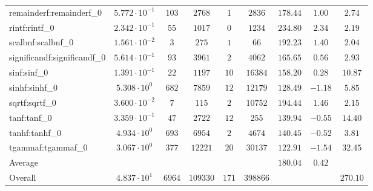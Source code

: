 \begin{tabular}{|l|c|c|c|c|c|c|c|c|}
remainderf:remainderf\_0     & $ 5.772 \cdot 10^{-1} $ & $ 103    $ & $ 2768   $ & $ 1   $ & $ 2836   $ & $ 178.44      $ & $ 1.00    $ & $ 2.74    $ \\
rintf:rintf\_0               & $ 2.342 \cdot 10^{-1} $ & $ 55     $ & $ 1017   $ & $ 0   $ & $ 1234   $ & $ 234.80      $ & $ 2.34    $ & $ 2.19    $ \\
scalbnf:scalbnf\_0           & $ 1.561 \cdot 10^{-2} $ & $ 3      $ & $ 275    $ & $ 1   $ & $ 66     $ & $ 192.23      $ & $ 1.40    $ & $ 2.04    $ \\
significandf:significandf\_0 & $ 5.614 \cdot 10^{-1} $ & $ 93     $ & $ 3961   $ & $ 2   $ & $ 4062   $ & $ 165.65      $ & $ 0.56    $ & $ 2.93    $ \\
sinf:sinf\_0                 & $ 1.391 \cdot 10^{-1} $ & $ 22     $ & $ 1197   $ & $ 10  $ & $ 16384  $ & $ 158.20      $ & $ 0.28    $ & $ 10.87   $ \\
sinhf:sinhf\_0               & $ 5.308 \cdot 10^{0}  $ & $ 682    $ & $ 7859   $ & $ 12  $ & $ 12179  $ & $ 128.49      $ & $ -1.18   $ & $ 5.85    $ \\
sqrtf:sqrtf\_0               & $ 3.600 \cdot 10^{-2} $ & $ 7      $ & $ 115    $ & $ 2   $ & $ 10752  $ & $ 194.44      $ & $ 1.46    $ & $ 2.15    $ \\
tanf:tanf\_0                 & $ 3.359 \cdot 10^{-1} $ & $ 47     $ & $ 2722   $ & $ 12  $ & $ 255    $ & $ 139.94      $ & $ -0.55   $ & $ 14.40   $ \\
tanhf:tanhf\_0               & $ 4.934 \cdot 10^{0}  $ & $ 693    $ & $ 6954   $ & $ 2   $ & $ 4674   $ & $ 140.45      $ & $ -0.52   $ & $ 3.81    $ \\
tgammaf:tgammaf\_0           & $ 3.067 \cdot 10^{0}  $ & $ 377    $ & $ 12221  $ & $ 20  $ & $ 30137  $ & $ 122.91      $ & $ -1.54   $ & $ 32.45   $ \\
\hline
Average                      & $                     $ & $        $ & $        $ & $     $ & $        $ & $ 180.04      $ & $ 0.42    $ & $         $ \\
\hline
Overall                      & $ 4.837 \cdot 10^{1}  $ & $ 6964   $ & $ 109330 $ & $ 171 $ & $ 398866 $ & $             $ & $         $ & $ 270.10  $ \\
\hline
\end{tabular}
